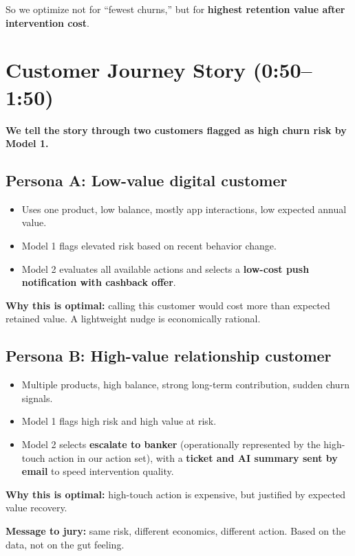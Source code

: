 \documentclass[11pt,a4paper]{article}
\begin{document}
So we optimize not for ``fewest churns,'' but for \textbf{highest retention value after intervention cost}.

\section{Customer Journey Story (0:50--1:50)}
\textbf{We tell the story through two customers flagged as high churn risk by Model 1.}

\subsection*{Persona A: Low-value digital customer}
\begin{itemize}
    \item Uses one product, low balance, mostly app interactions, low expected annual value.
    \item Model 1 flags elevated risk based on recent behavior change.
    \item Model 2 evaluates all available actions and selects a \textbf{low-cost push notification with cashback offer}.
\end{itemize}

\textbf{Why this is optimal:} calling this customer would cost more than expected retained value. A lightweight nudge is economically rational.

\subsection*{Persona B: High-value relationship customer}
\begin{itemize}
    \item Multiple products, high balance, strong long-term contribution, sudden churn signals.
    \item Model 1 flags high risk and high value at risk.
    \item Model 2 selects \textbf{escalate to banker} (operationally represented by the high-touch action in our action set), with a \textbf{ticket and AI summary sent by email} to speed intervention quality.
\end{itemize}

\textbf{Why this is optimal:} high-touch action is expensive, but justified by expected value recovery.

\textbf{Message to jury:} same risk, different economics, different action. Based on the data, not on the gut feeling.
\end{document}
